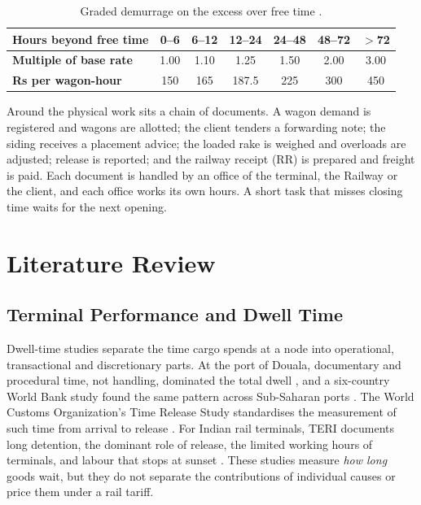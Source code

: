 \begin{table}[!htbp]
\centering
\caption[Graded demurrage on the excess over free time]{Graded demurrage on the excess over free time \cite{ircomp}.}
\label{tab:bands}
\small
\begin{tabular}{@{}lcccccc@{}}
\toprule
\textbf{Hours beyond free time} & 0--6 & 6--12 & 12--24 & 24--48 & 48--72 & $>$72 \\
\midrule
\textbf{Multiple of base rate} & 1.00 & 1.10 & 1.25 & 1.50 & 2.00 & 3.00 \\
\textbf{Rs per wagon-hour} & 150 & 165 & 187.5 & 225 & 300 & 450 \\
\bottomrule
\end{tabular}
\end{table}

Around the physical work sits a chain of documents. A wagon demand is registered and wagons are allotted; the client tenders a forwarding note; the siding receives a placement advice; the loaded rake is weighed and overloads are adjusted; release is reported; and the railway receipt (RR) is prepared and freight is paid. Each document is handled by an office of the terminal, the Railway or the client, and each office works its own hours. A short task that misses closing time waits for the next opening.

\section{Literature Review}
\label{sec:lit}

\subsection{Terminal Performance and Dwell Time}
Dwell-time studies separate the time cargo spends at a node into operational, transactional and discretionary parts. At the port of Douala, documentary and procedural time, not handling, dominated the total dwell \cite{refas}, and a six-country World Bank study found the same pattern across Sub-Saharan ports \cite{raballand}. The World Customs Organization's Time Release Study standardises the measurement of such time from arrival to release \cite{wco}. For Indian rail terminals, TERI documents long detention, the dominant role of release, the limited working hours of terminals, and labour that stops at sunset \cite{teri}. These studies measure \emph{how long} goods wait, but they do not separate the contributions of individual causes or price them under a rail tariff.

